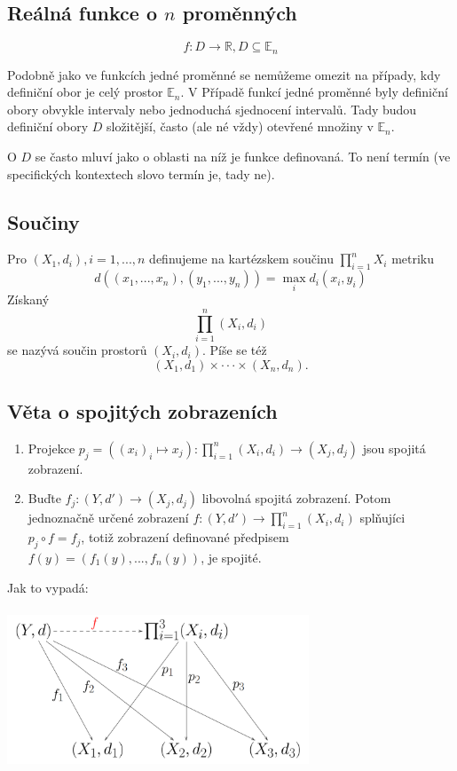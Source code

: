 \documentclass[../main.tex]{subfiles}
\begin{document}
\subsection{Reálná funkce o $n$ proměnných}
\hspace{1.2mm}
\[f: D \rightarrow \mathbb{R}, D \subseteq \mathbb{E}_n\]

\noindent
\hspace{1.2mm}
Podobně jako ve funkcích jedné proměnné se nemůžeme omezit na případy, kdy definiční obor je celý prostor $\mathbb{E}_n$. V 
Případě funkcí jedné proměnné byly definiční obory obvykle intervaly nebo jednoduchá sjednocení intervalů. Tady budou definiční
obory $D$ složitější, často (ale né vždy) otevřené množiny v $\mathbb{E}_n$.

O $D$ se často mluví jako o oblasti na níž je funkce definovaná. To není termín (ve specifických kontextech slovo  termín 
je, tady ne).

\subsection{Součiny}
\hspace{1.2mm}
Pro $(X_1,d_i), i = 1,...,n$ definujeme na kartézskem součinu $\prod^n_{i=1}X_i$ metriku
\[d((x_1,...,x_n),(y_1,...,y_n)) = \max_i d_i(x_i,y_i)\]
Získaný
\[\prod^n_{i=1}(X_i,d_i)\]
se nazývá součin prostorů $(X_i, d_i)$. Píše se též 
\[(X_1,d_1) \times \cdot \cdot \cdot \times (X_n,d_n).\]

\subsection{Věta o spojitých zobrazeních}
\begin{enumerate}
\item Projekce $p_j = ((x_i)_i \mapsto x_j) : \prod^n_{i=1}(X_i,d_i) \rightarrow (X_j,d_j)$ jsou spojitá zobrazení.

\item Buďte $f_j:(Y,d') \rightarrow (X_j,d_j)$ libovolná spojitá zobrazení. Potom jednoznačně určené zobrazení 
$f:(Y,d') \rightarrow \prod^n_{i=1}(X_i,d_i)$ splňujíci $p_j \circ f = f_j$, totiž zobrazení definované předpisem
$f(y) = (f_1(y),...,f_n(y))$, je spojité.
\end{enumerate}
Jak to vypadá:
\begin{center}
\includegraphics[width=9cm,height=4.8cm]{ipkm.png}
\end{center}
\end{document}

